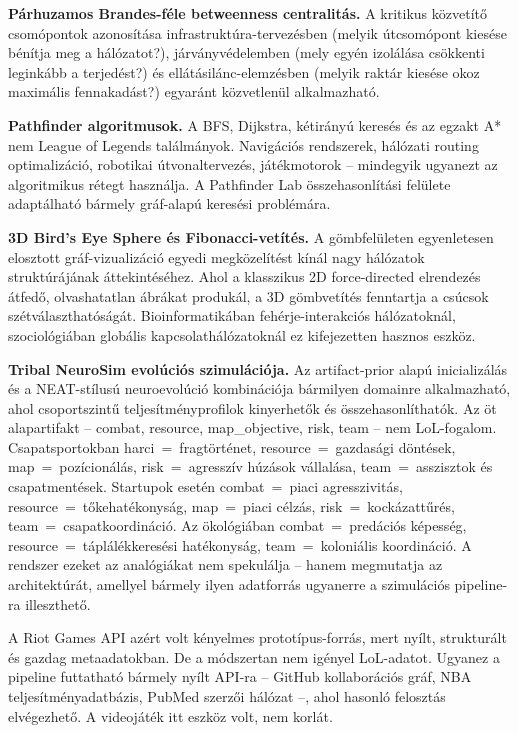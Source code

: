 ﻿\documentclass[a4paper,12pt]{report}
\begin{document}
\textbf{Párhuzamos Brandes-féle betweenness centralitás.} A kritikus közvetítő csomópontok
azonosítása infrastruktúra-tervezésben (melyik útcsomópont kiesése bénítja meg a hálózatot?),
járványvédelemben (mely egyén izolálása csökkenti leginkább a terjedést?) és
ellátásilánc-elemzésben (melyik raktár kiesése okoz maximális fennakadást?) egyaránt
közvetlenül alkalmazható.

\textbf{Pathfinder algoritmusok.} A BFS, Dijkstra, kétirányú keresés és az egzakt A* nem
League of Legends találmányok. Navigációs rendszerek, hálózati routing optimalizáció,
robotikai útvonaltervezés, játékmotorok -- mindegyik ugyanezt az algoritmikus rétegt
használja. A Pathfinder Lab összehasonlítási felülete adaptálható bármely gráf-alapú
keresési problémára.

\textbf{3D Bird's Eye Sphere és Fibonacci-vetítés.} A gömbfelületen egyenletesen elosztott
gráf-vizualizáció egyedi megközelítést kínál nagy hálózatok struktúrájának áttekintéséhez.
Ahol a klasszikus 2D force-directed elrendezés átfedő, olvashatatlan ábrákat produkál,
a 3D gömbvetítés fenntartja a csúcsok szétválaszthatóságát. Bioinformatikában fehérje-interakciós
hálózatoknál, szociológiában globális kapcsolathálózatoknál ez kifejezetten hasznos eszköz.

\textbf{Tribal NeuroSim evolúciós szimulációja.} Az artifact-prior alapú inicializálás
és a NEAT-stílusú neuroevolúció kombinációja bármilyen domainre alkalmazható, ahol
csoportszintű teljesítményprofilok kinyerhetők és összehasonlíthatók. Az öt
alapartifakt -- combat, resource, map\_objective, risk, team -- nem LoL-fogalom.
Csapatsportokban harci~=~fragtörténet, resource~=~gazdasági döntések, map~=~pozícionálás,
risk~=~agresszív húzások vállalása, team~=~asszisztok és csapatmentések. Startupok esetén
combat~=~piaci agresszivitás, resource~=~tőkehatékonyság, map~=~piaci célzás, risk~=~kockázattűrés,
team~=~csapatkoordináció. Az ökológiában combat~=~predációs képesség, resource~=~táplálékkeresési
hatékonyság, team~=~koloniális koordináció. A rendszer ezeket az analógiákat nem spekulálja --
hanem megmutatja az architektúrát, amellyel bármely ilyen adatforrás ugyanerre a szimulációs
pipeline-ra illeszthető.

A Riot Games API azért volt kényelmes prototípus-forrás, mert nyílt, strukturált és gazdag
metaadatokban. De a módszertan nem igényel LoL-adatot. Ugyanez a pipeline futtatható bármely
nyílt API-ra -- GitHub kollaborációs gráf, NBA teljesítményadatbázis, PubMed szerzői hálózat --,
ahol hasonló felosztás elvégezhető. A videojáték itt eszköz volt, nem korlát.
\end{document}
